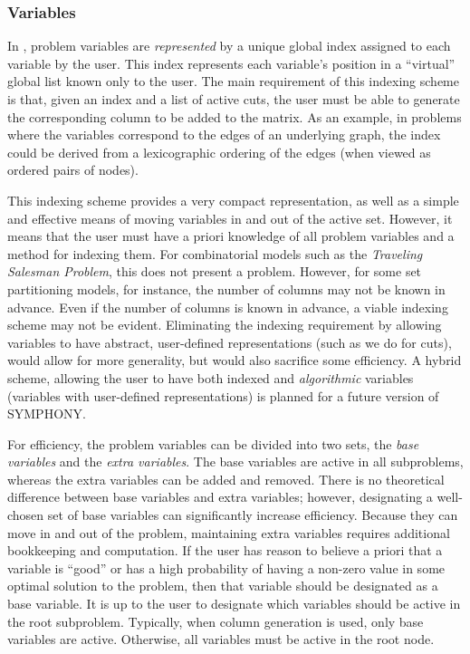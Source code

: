 
\subsubsection{Variables}
\label{variables}

In \BB, problem variables are {\em represented} by a unique global
index assigned to each variable by the user. This index represents
each variable's position in a ``virtual'' global list known only to
the user. The main requirement of this indexing scheme is that, given
an index and a list of active cuts, the user must be able to generate
the corresponding column to be added to the matrix. As an example, in
problems where the variables correspond to the edges of an underlying
graph, the index could be derived from a lexicographic ordering of the
edges (when viewed as ordered pairs of nodes).

This indexing scheme provides a very compact representation, as well
as a simple and effective means of moving variables in and out of the
active set. However, it means that the user must have a priori
knowledge of all problem variables and a method for indexing them. For
combinatorial models such as the {\em Traveling Salesman Problem},
this does not present a problem. However, for some set partitioning
models, for instance, the number of columns may not be known in
advance. Even if the number of columns is known in advance, a viable
indexing scheme may not be evident. Eliminating the indexing
requirement by allowing variables to have abstract, user-defined
representations (such as we do for cuts), would allow for more
generality, but would also sacrifice some efficiency. A hybrid scheme,
allowing the user to have both indexed and {\em algorithmic} variables
(variables with user-defined representations) is planned for a future 
version of SYMPHONY.

For efficiency, the problem variables can be divided into two sets, the
{\em base variables} and the {\em extra variables}. The base variables
are active in all subproblems, whereas the extra variables can be
added and removed. There is no theoretical difference between
base variables and extra variables; however, designating a well-chosen
set of base variables can significantly increase efficiency. Because
they can move in and out of the problem, maintaining extra variables
requires additional bookkeeping and computation. If the user has
reason to believe a priori that a variable is ``good'' or has a high
probability of having a non-zero value in some optimal solution to the
problem, then that variable should be designated as a base variable.
It is up to the user to designate which variables should be active in
the root subproblem. Typically, when column generation is used, only base 
variables are active. Otherwise, all variables must be active in the 
root node.

